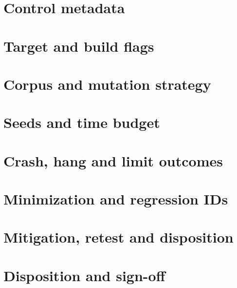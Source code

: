\documentclass[11pt,letterpaper]{article}
\begin{document}
\makedoctitle\makedocsummary
\section{Control metadata}
\section{Target and build flags}
\section{Corpus and mutation strategy}
\section{Seeds and time budget}
\section{Crash, hang and limit outcomes}
\section{Minimization and regression IDs}
\section{Mitigation, retest and disposition}
\section{Disposition and sign-off}
\end{document}

